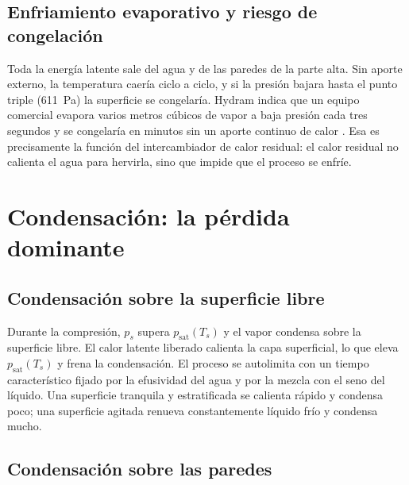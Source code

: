 \documentclass[11pt,a4paper]{article}
\newcommand{\psat}{p_{\mathrm{sat}}}
\begin{document}
\subsection{Enfriamiento evaporativo y riesgo de congelación}

Toda la energía latente sale del agua y de las paredes de la parte alta. Sin aporte externo, la temperatura caería ciclo a ciclo, y si la presión bajara hasta el punto triple (\SI{611}{\pascal}) la superficie se congelaría. Hydram indica que un equipo comercial evapora varios metros cúbicos de vapor a baja presión cada tres segundos y se congelaría en minutos sin un aporte continuo de calor \cite{hydramtech}. Esa es precisamente la función del intercambiador de calor residual: el calor residual no calienta el agua para hervirla, sino que impide que el proceso se enfríe.

\section{Condensación: la pérdida dominante}

\subsection{Condensación sobre la superficie libre}

Durante la compresión, $p_s$ supera $\psat(T_s)$ y el vapor condensa sobre la superficie libre. El calor latente liberado calienta la capa superficial, lo que eleva $\psat(T_s)$ y frena la condensación. El proceso se autolimita con un tiempo característico fijado por la efusividad del agua y por la mezcla con el seno del líquido. Una superficie tranquila y estratificada se calienta rápido y condensa poco; una superficie agitada renueva constantemente líquido frío y condensa mucho.

\subsection{Condensación sobre las paredes}
\end{document}
